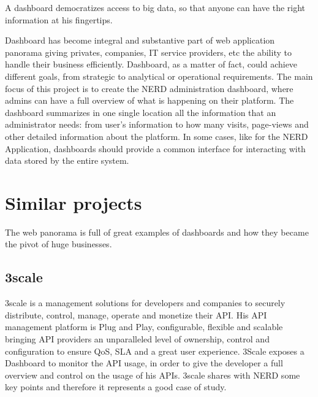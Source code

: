 \documentclass[a4paper,13pt]{report}
\begin{document}
A dashboard democratizes access to big data, so that anyone  can have the right information at his fingertips.

Dashboard has become integral and substantive part of web application panorama giving privates, companies, IT service providers, etc the ability to handle their business efficiently. Dashboard, as a matter of fact, could achieve different goals, from strategic to analytical or operational requirements.\newline
The main focus of this project is to create the NERD administration dashboard, where admins can have a full overview of what is happening on their platform. The dashboard summarizes in one single location all the information that an administrator needs: from user's information to how many visits, page-views and other detailed information about the platform. In some cases, like for the NERD Application, dashboards should provide a common interface for interacting with data stored by the entire system.

\chapter{Similar projects}

The web panorama is full of great examples of dashboards and how they became the pivot of huge businesses.
\section{3scale}
3scale is a management solutions for developers and companies to securely distribute, control, manage, operate and monetize their API. His API management platform is Plug and Play, configurable, flexible and scalable bringing API providers an unparalleled level of ownership, control and configuration to ensure QoS, SLA and a great user experience.
3Scale exposes a Dashboard to monitor the API usage, in order to give the developer a full overview and control on the usage of his APIs.
3scale shares with NERD some key points and therefore it  represents a good case of study.
\end{document}
